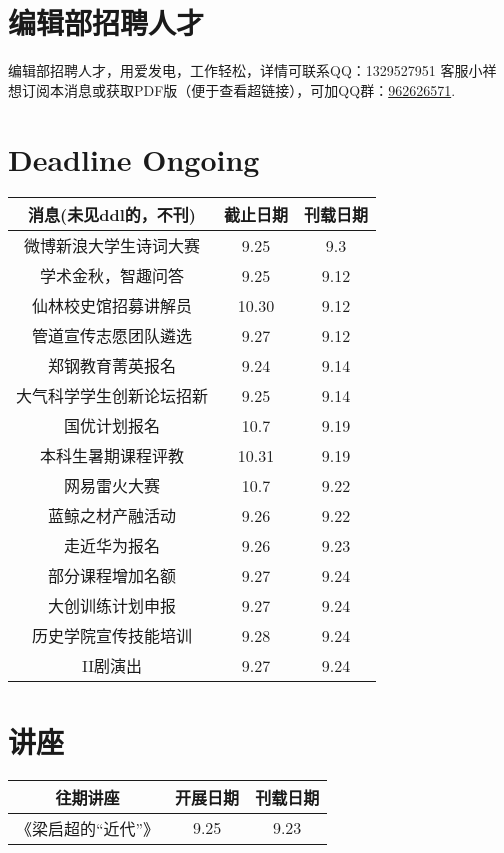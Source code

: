 \documentclass[letterpaper, 12pt]{article}
\begin{document}
\begin{multicols}{2}
\section{编辑部招聘人才}
编辑部招聘人才，用爱发电，工作轻松，详情可联系QQ：1329527951 客服小祥\\想订阅本消息或获取PDF版（便于查看超链接），可加QQ群：\href{https://qm.qq.com/q/FGX1VYCrGS}{962626571}.
\section{Deadline Ongoing}
\begin{tabular}{|c|c|c|}
    \hline
    消息(未见ddl的，不刊) & 截止日期 & 刊载日期\\
    \hline\hline
    微博新浪大学生诗词大赛 & 9.25 & 9.3\\
    学术金秋，智趣问答 & 9.25 & 9.12\\
    仙林校史馆招募讲解员 & 10.30 & 9.12\\
    管道宣传志愿团队遴选 & 9.27 & 9.12\\
    郑钢教育菁英报名 & 9.24 & 9.14\\
    大气科学学生创新论坛招新 & 9.25 & 9.14\\
    国优计划报名 & 10.7 & 9.19\\
    本科生暑期课程评教 & 10.31 & 9.19\\
    网易雷火大赛 & 10.7 & 9.22\\
    蓝鲸之材产融活动 & 9.26 & 9.22\\
    走近华为报名 & 9.26 & 9.23\\
    部分课程增加名额 & 9.27 & 9.24\\
    大创训练计划申报 & 9.27 & 9.24\\
    历史学院宣传技能培训 & 9.28 & 9.24\\
    II剧演出 & 9.27 & 9.24\\
    \hline
\end{tabular}

\section{讲座}
\begin{tabular}{|c|c|c|}
    \hline
    往期讲座 & 开展日期 & 刊载日期\\
    \hline\hline
    《梁启超的“近代”》 & 9.25 & 9.23\\
      \hline
\end{tabular}\\\\


\end{multicols}
\end{document}
